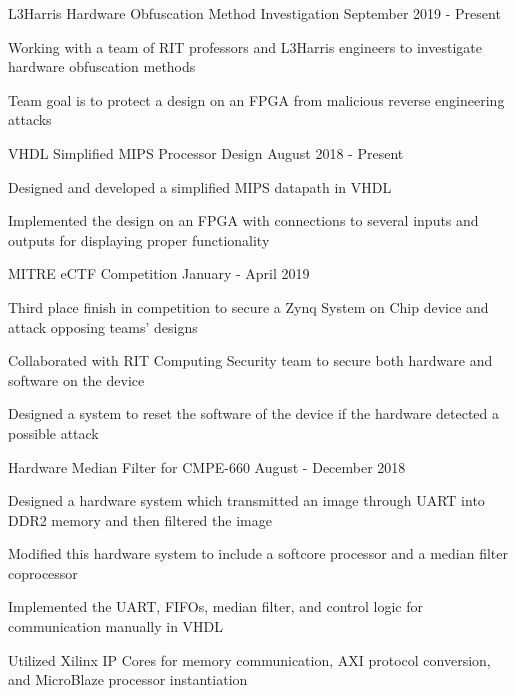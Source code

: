 
\begin{cventries}

	\cvproject
		{L3Harris Hardware Obfuscation Method Investigation}
		{September 2019 - Present}
		{
			\begin{cvitems}
			\item {Working with a team of RIT professors and L3Harris engineers to investigate hardware obfuscation methods}
			\item {Team goal is to protect a design on an FPGA from malicious reverse engineering attacks}
			\end{cvitems}
		}

	\cvproject
		{VHDL Simplified MIPS Processor Design}
		{August 2018 - Present}
		{
			\begin{cvitems}
			\item {Designed and developed a simplified MIPS datapath in VHDL}
			\item {Implemented the design on an FPGA with connections to several inputs and outputs for displaying proper functionality}
			\end{cvitems}
		}

	\cvproject
		{MITRE eCTF Competition}
		{January - April 2019}
		{
			\begin{cvitems}
			\item {Third place finish in competition to secure a Zynq System on Chip device and attack opposing teams' designs}
			\item {Collaborated with RIT Computing Security team to secure both hardware and software on the device}
			\item {Designed a system to reset the software of the device if the hardware detected a possible attack}
			\end{cvitems}
		}

	\cvproject
		{Hardware Median Filter for CMPE-660}
		{August - December 2018}
		{
			\begin{cvitems}
			\item {Designed a hardware system which transmitted an image through UART into DDR2 memory and then filtered the image}
			\item {Modified this hardware system to include a softcore processor and a median filter coprocessor}
			\item {Implemented the UART, FIFOs, median filter, and control logic for communication manually in VHDL}
			\item {Utilized Xilinx IP Cores for memory communication, AXI protocol conversion, and MicroBlaze processor instantiation}
			\end{cvitems}
		}


\end{cventries}
